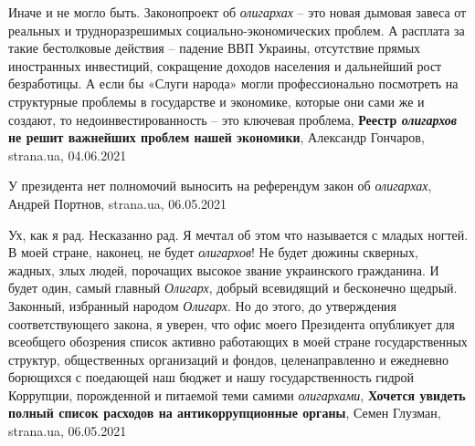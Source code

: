 Иначе и не могло быть. Законопроект об \emph{олигархах} – это новая дымовая
завеса от реальных и трудноразрешимых социально-экономических проблем. А
расплата за такие бестолковые действия – падение ВВП Украины, отсутствие прямых
иностранных инвестиций, сокращение доходов населения и дальнейший рост
безработицы. А если бы «Слуги народа» могли профессионально посмотреть на
структурные проблемы в государстве и экономике, которые они сами же и создают,
то недоинвестированность – это ключевая проблема,
\textbf{Реестр \emph{олигархов} не решит важнейших проблем нашей экономики},
Александр Гончаров, strana.ua, 04.06.2021

У президента нет полномочий выносить на референдум закон об \emph{олигархах},
Андрей Портнов, strana.ua, 06.05.2021

Ух, как я рад. Несказанно рад. Я мечтал об этом что называется с младых ногтей.
В моей стране, наконец, не будет \emph{олигархов}! Не будет дюжины скверных, жадных,
злых людей, порочащих высокое звание украинского гражданина. И будет один,
самый главный \emph{Олигарх}, добрый всевидящий и бесконечно щедрый. Законный,
избранный народом \emph{Олигарх}.  Но до этого, до утверждения соответствующего
закона, я уверен, что офис моего Президента опубликует для всеобщего обозрения
список активно работающих в моей стране государственных структур, общественных
организаций и фондов, целенаправленно и ежедневно борющихся с поедающей наш
бюджет и нашу государственность гидрой Коррупции, порожденной и питаемой теми
самими \emph{олигархами},
\textbf{Хочется увидеть полный список расходов на антикоррупционные органы},
Семен Глузман, strana.ua, 06.05.2021

